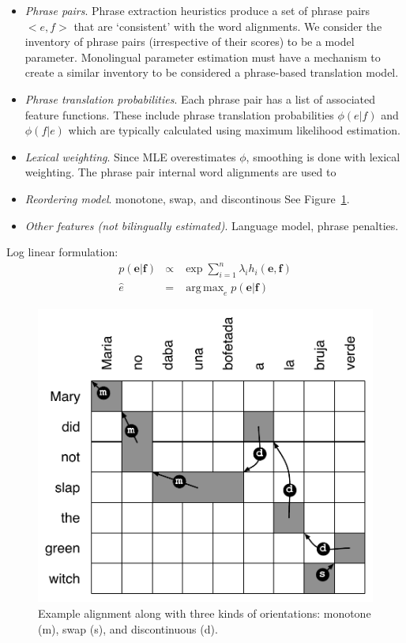 \documentclass[11pt]{article}
\DeclareMathOperator*{\argmax}{arg\,max}
\newcommand{\figref}[1]{Figure~\ref{#1}}
\begin{document}
\begin{itemize}
\item \emph{Phrase pairs}.  
Phrase extraction heuristics \cite{Venugopal2003,Tillmann2003,Och2004} produce a set of phrase pairs ${<e, f>}$ that are `consistent' with the word alignments.  We consider the inventory of phrase pairs (irrespective of their scores) to be a model parameter.  Monolingual parameter estimation must have a mechanism to create a similar inventory to be considered a phrase-based translation model.

\item \emph{Phrase translation probabilities}.  Each phrase pair has a list of associated feature functions.  These include phrase translation probabilities ${\phi(e|f)}$ and ${\phi(f|e)}$ which are  typically calculated using maximum likelihood estimation. 

\item \emph{Lexical weighting}.  Since MLE overestimates ${\phi}$, smoothing is done with lexical weighting.  The phrase pair internal word alignments are used to 

\item \emph{Reordering model}.  monotone, swap, and discontinous
See \figref{fig:reorderfeats}.
\cite{tillman:2004:HLTNAACL,Kumar2004}

\item \emph{Other features (not bilingually estimated)}. Language model, phrase penalties.
\end{itemize}

Log linear formulation:
  \begin{eqnarray*}
    p(\mathbf{e} | \mathbf{f}) & \propto & \exp \sum_{i=1}^{n}{\lambda_i h_i (\mathbf{e}, \mathbf{f})} \label{log-linear-formulation}\\
    \hat{e} & = & \argmax_{e}{p(\mathbf{e} | \mathbf{f}) }
  \end{eqnarray*}


\begin{figure}[t]
\vskip 0.1in
\begin{center}
\includegraphics[width=0.8 \linewidth]{../figures/reorderfeats/reorderfeats.pdf}
\caption{Example alignment along with three kinds of orientations: monotone (m), swap (s), and discontinuous (d). }
\label{fig:reorderfeats} 
\end{center}
\end{figure}
\end{document}
